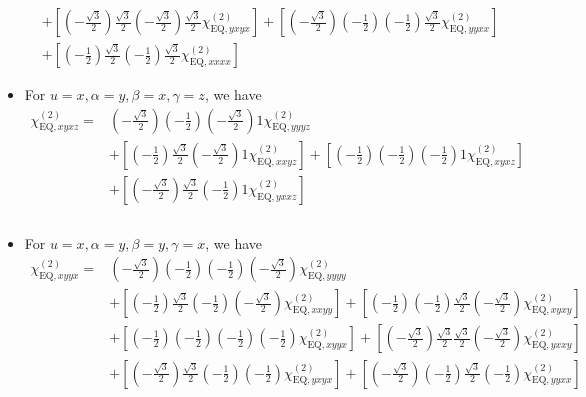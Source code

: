 \documentclass[UTF8,10pt,a4paper]{article}
\begin{document}
\begin{itemize}
\begin{align}
\nonumber&+\left[\left(-\frac{\sqrt{3}}{2}\right)\frac{\sqrt{3}}{2}\left(-\frac{\sqrt{3}}{2}\right)\frac{\sqrt{3}}{2}\chi_{\text{EQ},yxyx}^{(2)}\right]+\left[\left(-\frac{\sqrt{3}}{2}\right)\left(-\frac{1}{2}\right)\left(-\frac{1}{2}\right)\frac{\sqrt{3}}{2}\chi_{\text{EQ},yyxx}^{(2)}\right]\\
&+\left[\left(-\frac{1}{2}\right)\frac{\sqrt{3}}{2}\left(-\frac{1}{2}\right)\frac{\sqrt{3}}{2}\chi_{\text{EQ},xxxx}^{(2)}\right]
\end{align}\normalsize
\item For $u=x,\alpha=y,\beta=x,\gamma=z$, we have
\footnotesize\begin{align}
\nonumber\chi_{\text{EQ},xyxz}^{(2)}=&\left(-\frac{\sqrt{3}}{2}\right)\left(-\frac{1}{2}\right)\left(-\frac{\sqrt{3}}{2}\right)1\chi_{\text{EQ},yyyz}^{(2)}\\
\nonumber&+\left[\left(-\frac{1}{2}\right)\frac{\sqrt{3}}{2}\left(-\frac{\sqrt{3}}{2}\right)1\chi_{\text{EQ},xxyz}^{(2)}\right]+\left[\left(-\frac{1}{2}\right)\left(-\frac{1}{2}\right)\left(-\frac{1}{2}\right)1\chi_{\text{EQ},xyxz}^{(2)}\right]\\
\nonumber&+\left[\left(-\frac{\sqrt{3}}{2}\right)\frac{\sqrt{3}}{2}\left(-\frac{1}{2}\right)1\chi_{\text{EQ},yxxz}^{(2)}\right]\\
\nonumber&\\
&
\end{align}\normalsize
\item For $u=x,\alpha=y,\beta=y,\gamma=x$, we have
\footnotesize\begin{align}
\nonumber\chi_{\text{EQ},xyyx}^{(2)}=&\left(-\frac{\sqrt{3}}{2}\right)\left(-\frac{1}{2}\right)\left(-\frac{1}{2}\right)\left(-\frac{\sqrt{3}}{2}\right)\chi_{\text{EQ},yyyy}^{(2)}\\
\nonumber&+\left[\left(-\frac{1}{2}\right)\frac{\sqrt{3}}{2}\left(-\frac{1}{2}\right)\left(-\frac{\sqrt{3}}{2}\right)\chi_{\text{EQ},xxyy}^{(2)}\right]+\left[\left(-\frac{1}{2}\right)\left(-\frac{1}{2}\right)\frac{\sqrt{3}}{2}\left(-\frac{\sqrt{3}}{2}\right)\chi_{\text{EQ},xyxy}^{(2)}\right]\\
\nonumber&+\left[\left(-\frac{1}{2}\right)\left(-\frac{1}{2}\right)\left(-\frac{1}{2}\right)\left(-\frac{1}{2}\right)\chi_{\text{EQ},xyyx}^{(2)}\right]+\left[\left(-\frac{\sqrt{3}}{2}\right)\frac{\sqrt{3}}{2}\frac{\sqrt{3}}{2}\left(-\frac{\sqrt{3}}{2}\right)\chi_{\text{EQ},yxxy}^{(2)}\right]\\
\nonumber&+\left[\left(-\frac{\sqrt{3}}{2}\right)\frac{\sqrt{3}}{2}\left(-\frac{1}{2}\right)\left(-\frac{1}{2}\right)\chi_{\text{EQ},yxyx}^{(2)}\right]+\left[\left(-\frac{\sqrt{3}}{2}\right)\left(-\frac{1}{2}\right)\frac{\sqrt{3}}{2}\left(-\frac{1}{2}\right)\chi_{\text{EQ},yyxx}^{(2)}\right]\\

\end{align}
\end{itemize}
\end{document}

